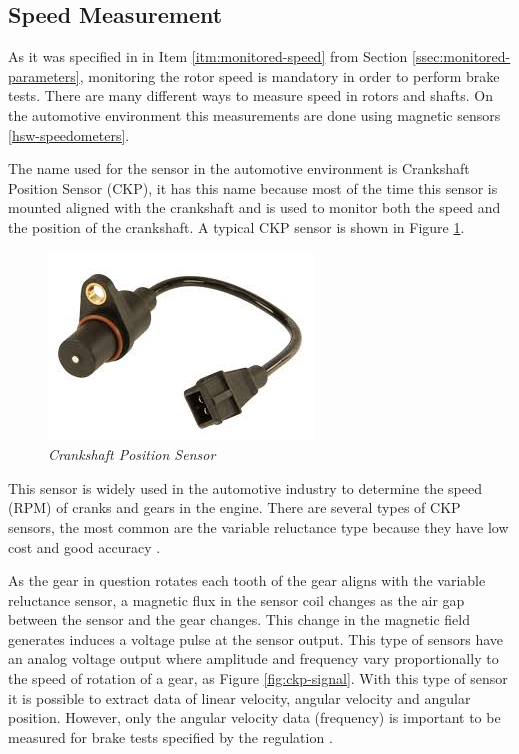 \subsection{Speed Measurement}\label{ssec:crankshaft-position-sensor}
	
	As it was specified in in Item \ref{itm:monitored-speed} from Section \ref{ssec:monitored-parameters}, monitoring the rotor speed is mandatory in order to perform brake tests. There are many different ways to measure speed in rotors and shafts. On the automotive environment this measurements are done using magnetic sensors \ref{hsw-speedometers}.
	\par
	The name used for the sensor in the automotive environment is Crankshaft Position Sensor (CKP), it has this name because most of the time this sensor is mounted aligned with the crankshaft and is used to monitor both the speed and the position of the crankshaft. A typical CKP sensor is shown in Figure \ref{fig-ckpReal}.

	\begin{figure}[htbp]
		\centering
			\includegraphics[scale=0.8]{figuras/fig-ckp-real.jpg}
		\caption{\textit{Crankshaft Position Sensor} \cite{ckp-gm}}
		\label{fig-ckpReal}
	\end{figure}

	This sensor is widely used in the automotive industry to determine the speed (RPM) of cranks and gears in the engine. There are several types of CKP sensors, the most common are the variable reluctance type because they have low cost and good accuracy \cite{schroeder2002crankshaft}.
	\par
	As the gear in question rotates each tooth of the gear aligns with the variable reluctance sensor, a magnetic flux in the sensor coil changes as the air gap between the sensor and the gear changes. This change in the magnetic field generates induces a voltage pulse at the sensor output. This type of sensors have an analog voltage output where amplitude and frequency vary proportionally to the speed of rotation of a gear, as Figure \ref{fig:ckp-signal}. With this type of sensor it is possible to extract data of linear velocity, angular velocity and angular position. However, only the angular velocity data (frequency) is important to be measured for brake tests specified by the regulation \cite{saej2522}. 

